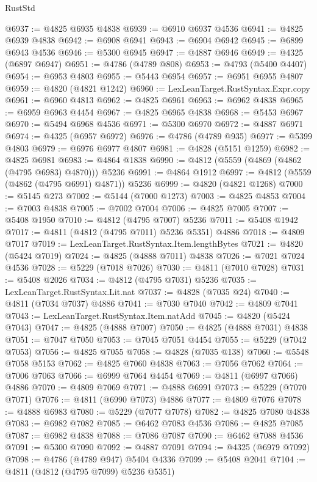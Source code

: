 \begin{lexlean}{RustStd}
\begin{coremodule}
@6937 := @4825 @6935 @4838
@6939 := @6910 @6937 @4536
@6941 := @4825 @6939 @4838
@6942 := @6908 @6941
@6943 := @6904 @6942
@6945 := @6899 @6943 @4536
@6946 := @5300 @6945
@6947 := @4887 @6946
@6949 := @4325 (@6897 @6947)
@6951 := @4786 (@4789 @808)
@6953 := @4793 (@5400 @4407)
@6954 := @6953 @4803
@6955 := @5443 @6954
@6957 := @6951 @6955 @4807
@6959 := @4820 (@4821 @1242)
@6960 := LexLeanTarget.RustSyntax.Expr.copy
@6961 := @6960 @4813
@6962 := @4825 @6961
@6963 := @6962 @4838
@6965 := @6959 @6963 @4454
@6967 := @4825 @6965 @4838
@6968 := @5453 @6967
@6970 := @5494 @6968 @4536
@6971 := @5300 @6970
@6972 := @4887 @6971
@6974 := @4325 (@6957 @6972)
@6976 := @4786 (@4789 @935)
@6977 := @5399 @4803
@6979 := @6976 @6977 @4807
@6981 := @4828 (@5151 @1259)
@6982 := @4825 @6981
@6983 := @4864 @1838
@6990 := @4812 (@5559 (@4869 (@4862 (@4795 @6983) @4870))) @5236
@6991 := @4864 @1912
@6997 := @4812 (@5559 (@4862 (@4795 @6991) @4871)) @5236
@6999 := @4820 (@4821 @1268)
@7000 := @5145 @273
@7002 := @5144 (@7000 @1273)
@7003 := @4825 @4853
@7004 := @7003 @4838
@7005 := @7002 @7004
@7006 := @4825 @7005
@7007 := @5408 @1950
@7010 := @4812 (@4795 @7007) @5236
@7011 := @5408 @1942
@7017 := @4811 (@4812 (@4795 @7011) @5236 @5351) @4886
@7018 := @4809 @7017
@7019 := LexLeanTarget.RustSyntax.Item.lengthBytes
@7021 := @4820 (@5424 @7019)
@7024 := @4825 (@4888 @7011) @4838
@7026 := @7021 @7024 @4536
@7028 := @5229 (@7018 @7026)
@7030 := @4811 (@7010 @7028)
@7031 := @5408 @2026
@7034 := @4812 (@4795 @7031) @5236
@7035 := LexLeanTarget.RustSyntax.Lit.nat
@7037 := @4828 (@7035 @24)
@7040 := @4811 (@7034 @7037) @4886
@7041 := @7030 @7040
@7042 := @4809 @7041
@7043 := LexLeanTarget.RustSyntax.Item.natAdd
@7045 := @4820 (@5424 @7043)
@7047 := @4825 (@4888 @7007)
@7050 := @4825 (@4888 @7031) @4838
@7051 := @7047 @7050
@7053 := @7045 @7051 @4454
@7055 := @5229 (@7042 @7053)
@7056 := @4825 @7055
@7058 := @4828 (@7035 @138)
@7060 := @5548 @7058 @5153
@7062 := @4825 @7060 @4838
@7063 := @7056 @7062
@7064 := @7006 @7063
@7066 := @6999 @7064 @4454
@7069 := @4811 (@6997 @7066) @4886
@7070 := @4809 @7069
@7071 := @4888 @6991
@7073 := @5229 (@7070 @7071)
@7076 := @4811 (@6990 @7073) @4886
@7077 := @4809 @7076
@7078 := @4888 @6983
@7080 := @5229 (@7077 @7078)
@7082 := @4825 @7080 @4838
@7083 := @6982 @7082
@7085 := @6462 @7083 @4536
@7086 := @4825 @7085
@7087 := @6982 @4838
@7088 := @7086 @7087
@7090 := @6462 @7088 @4536
@7091 := @5300 @7090
@7092 := @4887 @7091
@7094 := @4325 (@6979 @7092)
@7098 := @4786 (@4789 @947) @5404 @4336
@7099 := @5408 @2041
@7104 := @4811 (@4812 (@4795 @7099) @5236 @5351)

\end{coremodule}
\end{lexlean}
